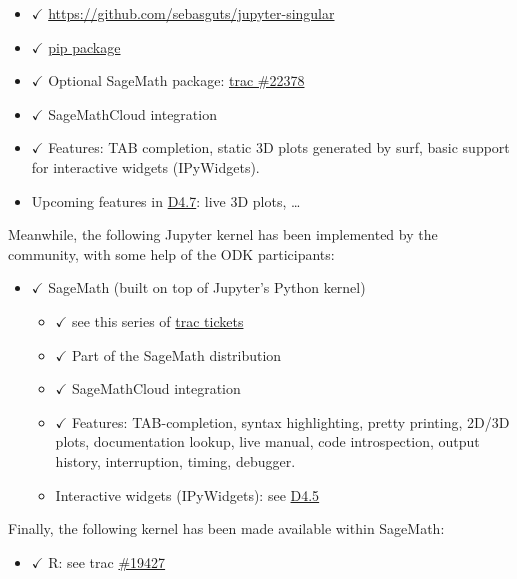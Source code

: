 \begin{itemize}
  \begin{itemize}
  \tightlist
  \item
    \(\checkmark\) \url{https://github.com/sebasguts/jupyter-singular}
  \item
    \(\checkmark\)
    \href{https://pypi.python.org/pypi/jupyter-kernel-singular/}{pip
    package}
  \item
    \(\checkmark\) Optional SageMath package:
    \href{https://trac.sagemath.org/ticket/22378}{trac \#22378}
  \item
    \(\checkmark\) SageMathCloud integration
  \item
    \(\checkmark\) Features: TAB completion, static 3D plots generated
    by surf, basic support for interactive widgets (IPyWidgets).
  \item
    Upcoming features in
    \href{https://github.com/OpenDreamKit/OpenDreamKit/issues/96}{D4.7}:
    live 3D plots, \ldots{}
  \end{itemize}
\end{itemize}

Meanwhile, the following Jupyter kernel has been implemented by the
community, with some help of the ODK participants:

\begin{itemize}
\tightlist
\item
  \(\checkmark\) SageMath (built on top of Jupyter's Python kernel)

  \begin{itemize}
  \tightlist
  \item
    \(\checkmark\) see this series of
    \href{https://trac.sagemath.org/query?status=closed\&summary=~Jupyter\&col=id\&col=summary\&col=status\&col=type\&col=priority\&col=milestone\&col=component\&order=priority}{trac
    tickets}
  \item
    \(\checkmark\) Part of the SageMath distribution
  \item
    \(\checkmark\) SageMathCloud integration
  \item
    \(\checkmark\) Features: TAB-completion, syntax highlighting, pretty
    printing, 2D/3D plots, documentation lookup, live manual, code
    introspection, output history, interruption, timing, debugger.
  \item
    Interactive widgets (IPyWidgets): see
    \href{https://github.com/OpenDreamKit/OpenDreamKit/issues/94}{D4.5}
  \end{itemize}
\end{itemize}

Finally, the following kernel has been made available within SageMath:

\begin{itemize}
\tightlist
\item
  \(\checkmark\) R: see trac
  \href{https://trac.sagemath.org/ticket/19427}{\#19427}
\end{itemize}
